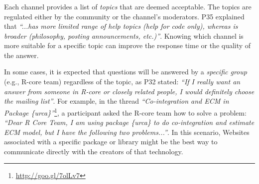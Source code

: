 \subsubsection{\reca}


    Each channel provides a list of \textit{topics} that are deemed acceptable.
    The topics are regulated either by the community or the channel's moderators.
    P35 explained that \textit{``...\SO has more limited range of help topics (help for code only), whereas \RH is broader (philosophy, posting announcements, etc.)''}.
    Knowing which channel is more suitable for a specific topic can improve the response time or the quality of the answer.


    In some cases, it is expected that questions will be answered by a \textit{specific group} (e.g., R-core team) regardless of the topic, as P32 stated: \textit{``If I really want an answer from someone in R-core or closely related people, I would definitely choose the mailing list''}.
    For example, in the \RH thread \textit{``Co-integration and ECM in Package \{urca\}''}\footnote{\url{http://goo.gl/7olLv7}}, a participant asked the R-core team how to solve a problem: \textit{``Dear R Core Team, I am using package \{urca\} to do co-integration and estimate ECM model, but I have the following two problems...''}.
    In this scenario, Websites associated with a specific package or library might be the best way to communicate directly with the creators of that technology.
     


